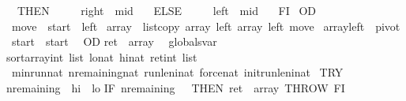 \begin{isabellebody}
\ \ THEN\ \isanewline
\ \ \ \ {\isasymacute}right\ {\isacharcolon}{\isacharequal}{\isacharequal}\ {\isasymacute}mid\ \isanewline
\ \ ELSE\ \isanewline
\ \ \ \ {\isasymacute}left\ {\isacharcolon}{\isacharequal}{\isacharequal}\ {\isasymacute}mid{\isacharplus}{}\ \isanewline
\ \ FI\isanewline
\ OD{\isacharsemicolon}{\isacharsemicolon}\isanewline
\ {\isasymacute}move\ {\isacharcolon}{\isacharequal}{\isacharequal}\ {\isasymacute}start\ {\isacharminus}\ {\isasymacute}left{\isacharsemicolon}{\isacharsemicolon}\isanewline
\ {\isasymacute}array\ {\isacharcolon}{\isacharequal}{\isacharequal}\ list{\isacharunderscore}copy\ {\isasymacute}array\ {\isacharparenleft}{\isasymacute}left{\isacharplus}{}{\isacharparenright}\ {\isasymacute}array\ {\isasymacute}left\ {\isasymacute}move{\isacharsemicolon}{\isacharsemicolon}\isanewline
\ {\isasymacute}array{\isacharbang}{\isasymacute}left\ {\isacharcolon}{\isacharequal}{\isacharequal}\ {\isasymacute}pivot{\isacharsemicolon}{\isacharsemicolon}\isanewline
\ {\isasymacute}start\ {\isacharcolon}{\isacharequal}{\isacharequal}\ {\isasymacute}start\ {\isacharplus}\ {}\isanewline
OD{\isacharsemicolon}{\isacharsemicolon}\isanewline
{\isasymacute}ret\ {\isacharcolon}{\isacharequal}{\isacharequal}\ {\isasymacute}array\isanewline
{\isachardoublequoteclose}\isanewline
\isanewline
{}\isamarkupfalse%
\ {\isacharparenleft}\ globals{\isacharunderscore}var{\isacharparenright}\isanewline
sort{\isacharparenleft}array{\isacharcolon}{\isacharcolon}{\isachardoublequoteopen}int\ list{\isachardoublequoteclose}{\isacharcomma}\ lo{\isacharcolon}{\isacharcolon}nat{\isacharcomma}\ hi{\isacharcolon}{\isacharcolon}nat{\isacharbar}\ ret{\isacharcolon}{\isacharcolon}{\isachardoublequoteopen}int\ list{\isachardoublequoteclose}{\isacharparenright}\isanewline
{}\ min{\isacharunderscore}run{\isacharcolon}{\isacharcolon}nat\ n{\isacharunderscore}remaining{\isacharcolon}{\isacharcolon}nat\ run{\isacharunderscore}len{\isacharunderscore}i{\isacharcolon}{\isacharcolon}nat\ force{\isacharcolon}{\isacharcolon}nat\ init{\isacharunderscore}run{\isacharunderscore}len{\isacharunderscore}i{\isacharcolon}{\isacharcolon}nat\ \isanewline
{\isachardoublequoteopen}\isanewline
TRY\isanewline
{\isasymacute}n{\isacharunderscore}remaining\ {\isacharcolon}{\isacharequal}{\isacharequal}\ {\isasymacute}hi\ {\isacharminus}\ {\isasymacute}lo{\isacharsemicolon}{\isacharsemicolon}\isanewline
IF\ {\isacharparenleft}{\isasymacute}n{\isacharunderscore}remaining\ {\isacharless}\ {}{\isacharparenright}\ THEN\ {\isasymacute}ret\ {\isacharcolon}{\isacharequal}{\isacharequal}\ {\isasymacute}array{\isacharsemicolon}{\isacharsemicolon}\ THROW\ FI{\isacharsemicolon}{\isacharsemicolon}\isanewline

\end{isabellebody}
